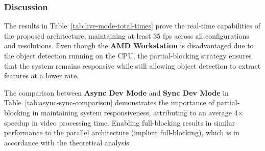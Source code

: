 \documentclass[conference]{IEEEtran}
\begin{document}

\subsubsection{Discussion}

The results in Table~\ref{tab:live-mode-total-times} prove the real-time capabilities of the proposed architecture, maintaining at least 35 fps across all configurations and resolutions.
Even though the \textbf{AMD Workstation} is disadvantaged due to the object detection running on the CPU, the partial-blocking strategy ensures that the system remains responsive while still allowing object detection to extract features at a lower rate.

The comparison between \textbf{Async Dev Mode} and \textbf{Sync Dev Mode} in Table~\ref{tab:async-sync-comparison} demonstrates the importance of partial-blocking in maintaining system responsiveness, attributing to an average 4$\times$ speedup in video processing time.
Enabling full-blocking results in similar performance to the parallel architecture (implicit full-blocking), which is in accordance with the theoretical analysis.
\end{document}
